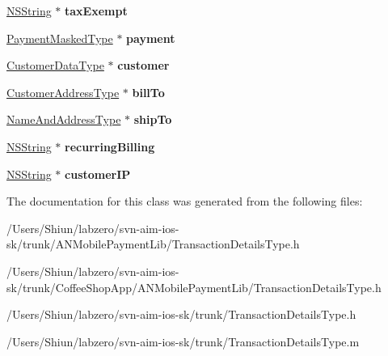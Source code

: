 \begin{DoxyCompactItemize}
\item 
\hypertarget{interface_transaction_details_type_a9266a8fd7991d479752ebe1e7d6afabc}{
\hyperlink{class_n_s_string}{NSString} $\ast$ {\bfseries taxExempt}}
\label{interface_transaction_details_type_a9266a8fd7991d479752ebe1e7d6afabc}

\item 
\hypertarget{interface_transaction_details_type_a8e03858cda9dc3ca90be0e114e28a88b}{
\hyperlink{interface_payment_masked_type}{PaymentMaskedType} $\ast$ {\bfseries payment}}
\label{interface_transaction_details_type_a8e03858cda9dc3ca90be0e114e28a88b}

\item 
\hypertarget{interface_transaction_details_type_ad5e6346a0c4b0b41dd952ed995cba0a4}{
\hyperlink{interface_customer_data_type}{CustomerDataType} $\ast$ {\bfseries customer}}
\label{interface_transaction_details_type_ad5e6346a0c4b0b41dd952ed995cba0a4}

\item 
\hypertarget{interface_transaction_details_type_a36794a1bde0f44ccd0e270fa1de127e3}{
\hyperlink{interface_customer_address_type}{CustomerAddressType} $\ast$ {\bfseries billTo}}
\label{interface_transaction_details_type_a36794a1bde0f44ccd0e270fa1de127e3}

\item 
\hypertarget{interface_transaction_details_type_ae55259d18093591a81b766a8cb40ffee}{
\hyperlink{interface_name_and_address_type}{NameAndAddressType} $\ast$ {\bfseries shipTo}}
\label{interface_transaction_details_type_ae55259d18093591a81b766a8cb40ffee}

\item 
\hypertarget{interface_transaction_details_type_aa11a92f2ecef53b77a587bd6e8300e11}{
\hyperlink{class_n_s_string}{NSString} $\ast$ {\bfseries recurringBilling}}
\label{interface_transaction_details_type_aa11a92f2ecef53b77a587bd6e8300e11}

\item 
\hypertarget{interface_transaction_details_type_a4e8fed57ff85485f28701a3a09c05c36}{
\hyperlink{class_n_s_string}{NSString} $\ast$ {\bfseries customerIP}}
\label{interface_transaction_details_type_a4e8fed57ff85485f28701a3a09c05c36}

\end{DoxyCompactItemize}


The documentation for this class was generated from the following files:\begin{DoxyCompactItemize}
\item 
/Users/Shiun/labzero/svn-\/aim-\/ios-\/sk/trunk/ANMobilePaymentLib/TransactionDetailsType.h\item 
/Users/Shiun/labzero/svn-\/aim-\/ios-\/sk/trunk/CoffeeShopApp/ANMobilePaymentLib/TransactionDetailsType.h\item 
/Users/Shiun/labzero/svn-\/aim-\/ios-\/sk/trunk/TransactionDetailsType.h\item 
/Users/Shiun/labzero/svn-\/aim-\/ios-\/sk/trunk/TransactionDetailsType.m\end{DoxyCompactItemize}
